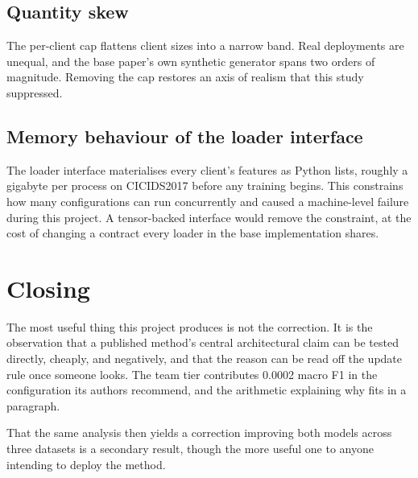 \subsection{Quantity skew}

The per-client cap flattens client sizes into a narrow band. Real deployments
are unequal, and the base paper's own synthetic generator spans two orders of
magnitude. Removing the cap restores an axis of realism that this study
suppressed.

\subsection{Memory behaviour of the loader interface}

The loader interface materialises every client's features as Python lists,
roughly a gigabyte per process on CICIDS2017 before any training begins. This
constrains how many configurations can run concurrently and caused a
machine-level failure during this project. A tensor-backed interface would
remove the constraint, at the cost of changing a contract every loader in the
base implementation shares.

\section{Closing}
\label{sec:closing}

The most useful thing this project produces is not the correction. It is the
observation that a published method's central architectural claim can be tested
directly, cheaply, and negatively, and that the reason can be read off the
update rule once someone looks. The team tier contributes 0.0002 macro F1 in the
configuration its authors recommend, and the arithmetic explaining why fits in a
paragraph.

That the same analysis then yields a correction improving both models across
three datasets is a secondary result, though the more useful one to anyone
intending to deploy the method.
